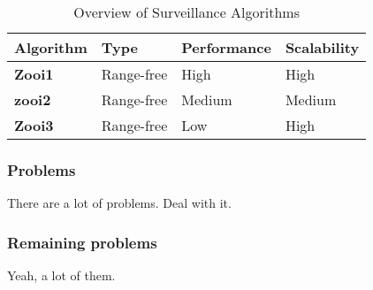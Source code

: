   \begin{table}[H]
  \renewcommand{\arraystretch}{1.3}
  \caption{Overview of Surveillance Algorithms}
  \label{table_example}
  \centering
    \begin{tabular}{|l|l|l|l|}
    \hline
    \bfseries Algorithm & \bfseries Type & \bfseries Performance & \bfseries Scalability\\
    \hline
    \bfseries Zooi1 & Range-free & High & High\\\hline
    \bfseries zooi2 & Range-free & Medium & Medium\\\hline
    \bfseries Zooi3 & Range-free & Low  & High\\\hline
    \end{tabular}
  \end{table}


\subsubsection{Problems}
There are a lot of problems. Deal with it. 


\subsubsection{Remaining problems}
Yeah, a lot of them. 